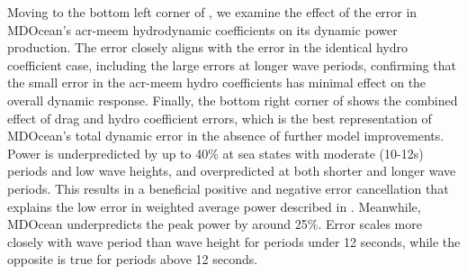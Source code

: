 \documentclass[a4paper,fleqn,colorlinks,unicode,lineno]{cas-dc} %
\begin{document}
Moving to the bottom left corner of , we examine the effect of the error in MDOcean's \gls{acr-meem} hydrodynamic coefficients on its dynamic power production.
The error closely aligns with the error in the identical hydro coefficient case, including the large errors at longer wave periods, confirming that the small error in the \gls{acr-meem} hydro coefficients has minimal effect on the overall dynamic response.
Finally, the bottom right corner of  shows the combined effect of drag and hydro coefficient errors, which is the best representation of MDOcean's total dynamic error in the absence of further model improvements.
Power is underpredicted by up to 40\% at sea states with moderate (10-12s) periods and low wave heights, and overpredicted at both shorter and longer wave periods.
This results in a beneficial positive and negative error cancellation that explains the low error in weighted average power described in .
Meanwhile, MDOcean underpredicts the peak power by around 25\%.
Error scales more closely with wave period than wave height for periods under 12 seconds, while the opposite is true for periods above 12 seconds.
\end{document}

